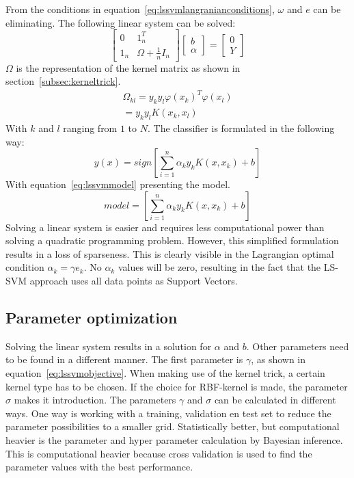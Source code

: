 From the conditions in equation~\ref{eq:lssvmlangranianconditions}, $\omega$ and $e$ can be eliminating. 
The following linear system can be solved:
\begin{equation}
	\left[
	\begin{array}{c|c}
	0 & 1_n^T \\ 
	\hline
	1_n & \Omega +\frac{1}{n}I_n
	\end{array}
	\right]
	\left[
	\begin{array}{c}
	b\\
	\hline
	\alpha
	\end{array}
	\right]
	=
	\left[
	\begin{array}{c}
	0\\
	\hline
	Y
	\end{array}
	\right]
\end{equation}
$\Omega$ is the representation of the kernel matrix as shown in section~\ref{subsec:kerneltrick}.
\begin{equation}
	\begin{split}
		\Omega_{kl} = y_k y_l \varphi(x_k)^T \varphi(x_l) \\
		= y_k y_l K(x_k, x_l)
	\end{split}
\end{equation}
With $k$ and $l$ ranging from $1$ to $N$.
The classifier is formulated in the following way:
\begin{equation}
	y(x) = sign \left[\sum_{i=1}^{n} \alpha_k y_k K(x,x_k) + b\right]
	\label{eq:lssvmclassifier}
\end{equation}
With equation~\ref{eq:lssvmmodel} presenting the model.
\begin{equation}
	model = \left[\sum_{i=1}^{n} \alpha_k y_k K(x,x_k) + b\right]
	\label{eq:lssvmmodel}
\end{equation}
Solving  a linear system is easier and requires less computational power than solving a quadratic programming problem. 
However, this simplified formulation results in a loss of sparseness. 
This is clearly visible in the Lagrangian optimal condition $\alpha_k =\gamma e_k$.
No $\alpha_k$ values will be zero, resulting in the fact that the LS-SVM approach uses all data points as Support Vectors.
\subsection{Parameter optimization}
Solving the linear system results in a solution for $\alpha$ and $b$.
Other parameters need to be found in a different manner.
The first parameter is $\gamma$, as shown in equation~\ref{eq:lssvmobjective}.
When making use of the kernel trick, a certain kernel type has to be chosen.
If the choice for RBF-kernel is made, the parameter $\sigma$ makes it introduction.
The parameters $\gamma$ and $\sigma$ can be calculated in different ways.
One way is working with a training, validation en test set to reduce the parameter possibilities to a smaller grid.
Statistically better, but computational heavier is the parameter and hyper parameter calculation by Bayesian inference. 
This is computational heavier because cross validation is used to find the parameter values with the best performance. 
